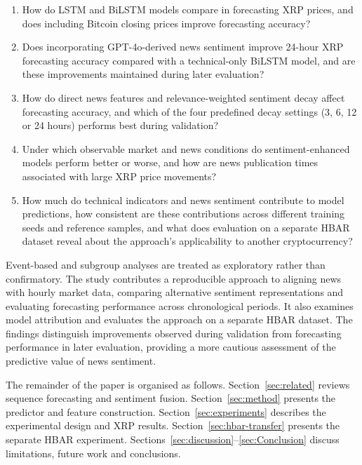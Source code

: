 \begin{enumerate}

\item[\textbf{RQ1}] How do LSTM and BiLSTM models compare in forecasting XRP prices, and does including Bitcoin closing prices improve forecasting accuracy?

\item[\textbf{RQ2}] Does incorporating GPT-4o-derived news sentiment improve 24-hour XRP forecasting accuracy compared with a technical-only BiLSTM model, and are these improvements maintained during later evaluation?

\item[\textbf{RQ3}] How do direct news features and relevance-weighted sentiment decay affect forecasting accuracy, and which of the four predefined decay settings (3, 6, 12 or 24 hours) performs best during validation?

\item[\textbf{RQ4}] Under which observable market and news conditions do sentiment-enhanced models perform better or worse, and how are news publication times associated with large XRP price movements?

\item[\textbf{RQ5}] How much do technical indicators and news sentiment contribute to model predictions, how consistent are these contributions across different training seeds and reference samples, and what does evaluation on a separate HBAR dataset reveal about the approach's applicability to another cryptocurrency?

\end{enumerate}

Event-based and subgroup analyses are treated as exploratory rather than confirmatory. The study contributes a reproducible approach to aligning news with hourly market data, comparing alternative sentiment representations and evaluating forecasting performance across chronological periods. It also examines model attribution and evaluates the approach on a separate HBAR dataset. The findings distinguish improvements observed during validation from forecasting performance in later evaluation, providing a more cautious assessment of the predictive value of news sentiment.


The remainder of the paper is organised as follows. Section~\ref{sec:related} reviews sequence forecasting and sentiment fusion. Section~\ref{sec:method} presents the predictor and feature construction. Section~\ref{sec:experiments} describes the experimental design and XRP results. Section~\ref{sec:hbar-transfer} presents the separate HBAR experiment. Sections~\ref{sec:discussion}--\ref{sec:Conclusion} discuss limitations, future work and conclusions.


